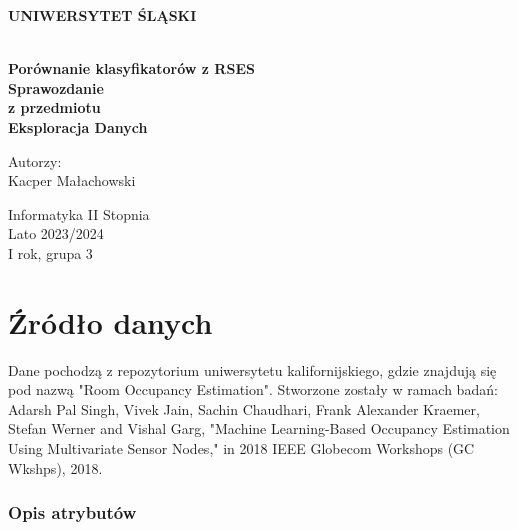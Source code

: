 \documentclass[12pt,oneside,a4paper]{book} %
\theoremstyle{break}
\begin{document}
\thispagestyle{empty}
\begin{center}
  \Large
  \bf{UNIWERSYTET ŚLĄSKI}\\
  \bf{}\\[25mm]
  \large

  \bf{Porównanie klasyfikatorów z RSES}\\[35mm]

  Sprawozdanie\\
  z przedmiotu\\
  Eksploracja Danych\\[25mm]
\end{center}
\begin{flushright}
  \large
  Autorzy:\\
  Kacper Małachowski\\
\end{flushright}
\vspace*{\fill}
\begin{center}
  Informatyka II Stopnia\\
  Lato 2023/2024\\
  I rok, grupa 3\\[25mm]
\end{center}

\chapter*{Źródło danych}

Dane pochodzą z repozytorium uniwersytetu kalifornijskiego, gdzie znajdują się pod nazwą "Room Occupancy Estimation".
Stworzone zostały w ramach badań: Adarsh Pal Singh, Vivek Jain, Sachin Chaudhari, Frank Alexander Kraemer, Stefan Werner and Vishal Garg, "Machine Learning-Based Occupancy Estimation Using Multivariate Sensor Nodes," in 2018 IEEE Globecom Workshops (GC Wkshps), 2018.

\subsection*{Opis atrybutów}
\end{document}

